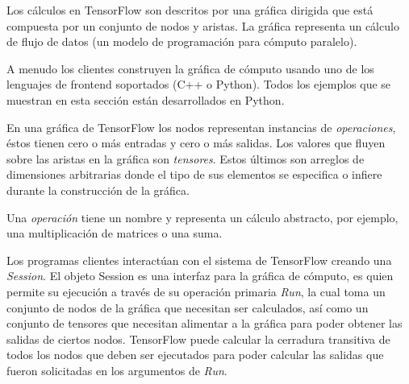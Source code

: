 \begin{remark}
Los cálculos en TensorFlow son descritos por una gráfica dirigida
que está compuesta por un conjunto de nodos y aristas.
La gráfica representa un cálculo de flujo de datos \cite{tensorflow} (un modelo
de programación para cómputo paralelo).
\end{remark}
A menudo los clientes construyen la gráfica de cómputo usando uno de los
lenguajes de frontend soportados (C++ o Python). Todos los ejemplos
que se muestran en esta sección están desarrollados en Python.

En una gráfica de TensorFlow los nodos representan instancias de \textit{operaciones}, éstos tienen cero o más entradas y
cero o más salidas. Los valores que fluyen sobre las aristas en la gráfica son
\textit{tensores}. Estos últimos son arreglos de dimensiones arbitrarias donde el tipo
de sus elementos se especifica o infiere durante la construcción de la gráfica.

Una \textit{operación} tiene un nombre y representa un cálculo abstracto, por ejemplo,
una multiplicación de matrices o una suma. 

Los programas clientes interactúan con el sistema de TensorFlow creando una
\textit{Session}. El objeto Session es una interfaz para la gráfica de cómputo,
es quien permite su ejecución a través de su operación primaria
\textit{Run}, la cual toma un conjunto de nodos de la gráfica que necesitan ser
calculados, así como un conjunto de tensores que necesitan alimentar a la 
gráfica para poder obtener las salidas de ciertos nodos. TensorFlow puede calcular
la cerradura transitiva de todos los nodos que deben ser ejecutados
para poder calcular las salidas que fueron solicitadas en los argumentos de \textit{Run}.

